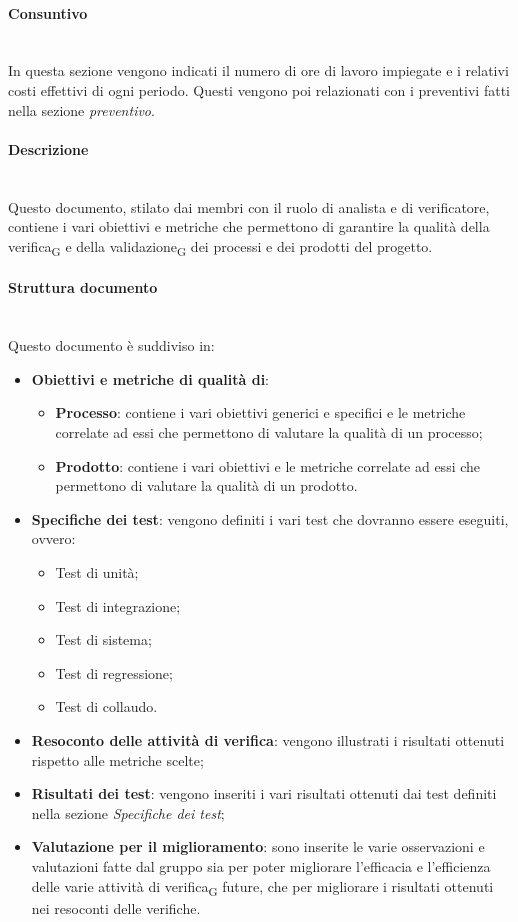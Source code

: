 \paragraph {Consuntivo}\mbox{}\\
In questa sezione vengono indicati il numero di ore di lavoro impiegate e i relativi costi effettivi di ogni periodo. Questi vengono poi relazionati con i preventivi fatti nella sezione \textit{preventivo}.

\paragraph {Descrizione}\mbox{}\\
Questo documento, stilato dai membri con il ruolo di analista e di verificatore, contiene i vari obiettivi e metriche che permettono di garantire la qualità della verifica\textsubscript{G} e della validazione\textsubscript{G} dei processi e dei prodotti del progetto.
\paragraph {Struttura documento}\mbox{}\\
Questo documento è suddiviso in:
\begin{itemize}
	\item \textbf{Obiettivi e metriche di qualità di}:
	\begin{itemize}
		\item \textbf{Processo}: contiene i vari obiettivi generici e specifici e le metriche correlate ad essi che permettono di valutare la qualità di un processo;
		\item \textbf{Prodotto}: contiene i vari obiettivi e le metriche correlate ad essi che permettono di valutare la qualità di un prodotto.
	\end{itemize}
	\item \textbf{Specifiche dei test}: vengono definiti i vari test che dovranno essere eseguiti, ovvero:
	\begin{itemize}
		\item Test di unità;
		\item Test di integrazione;
		\item Test di sistema;
		\item Test di regressione;
		\item Test di collaudo.
	\end{itemize}
	\item \textbf{Resoconto delle attività di verifica}: vengono illustrati i risultati ottenuti rispetto alle metriche scelte;
	\item \textbf{Risultati dei test}: vengono inseriti i vari risultati ottenuti dai test definiti nella sezione \textit{Specifiche dei test};
	\item \textbf{Valutazione per il miglioramento}: sono inserite le varie osservazioni e valutazioni fatte dal gruppo sia per poter migliorare l'efficacia e l'efficienza delle varie attività di verifica\textsubscript{G} future, che per migliorare i risultati ottenuti nei resoconti delle verifiche.
\end{itemize} 
